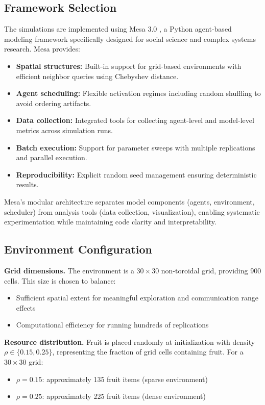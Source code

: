 \subsection{Framework Selection}

The simulations are implemented using Mesa 3.0 \citep{kazil2020}, a Python agent-based modeling framework specifically designed for social science and complex systems research. Mesa provides:

\begin{itemize}
    \item \textbf{Spatial structures:} Built-in support for grid-based environments with efficient neighbor queries using Chebyshev distance.
    \item \textbf{Agent scheduling:} Flexible activation regimes including random shuffling to avoid ordering artifacts.
    \item \textbf{Data collection:} Integrated tools for collecting agent-level and model-level metrics across simulation runs.
    \item \textbf{Batch execution:} Support for parameter sweeps with multiple replications and parallel execution.
    \item \textbf{Reproducibility:} Explicit random seed management ensuring deterministic results.
\end{itemize}

Mesa's modular architecture separates model components (agents, environment, scheduler) from analysis tools (data collection, visualization), enabling systematic experimentation while maintaining code clarity and interpretability.

\subsection{Environment Configuration}

\textbf{Grid dimensions.} The environment is a $30 \times 30$ non-toroidal grid, providing 900 cells. This size is chosen to balance:
\begin{itemize}
    \item Sufficient spatial extent for meaningful exploration and communication range effects
    \item Computational efficiency for running hundreds of replications
\end{itemize}

\textbf{Resource distribution.} Fruit is placed randomly at initialization with density $\rho \in \{0.15, 0.25\}$, representing the fraction of grid cells containing fruit. For a $30 \times 30$ grid:
\begin{itemize}
    \item $\rho = 0.15$: approximately 135 fruit items (sparse environment)
    \item $\rho = 0.25$: approximately 225 fruit items (dense environment)
\end{itemize}

